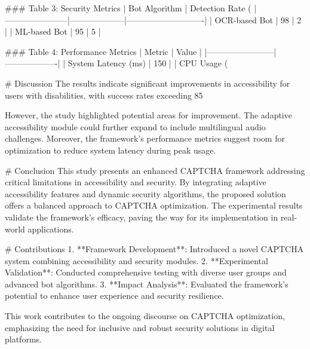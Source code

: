 ### Table 3: Security Metrics  
| Bot Algorithm         | Detection Rate (%
|-----------------------|--------------------|----------------------------|  
| OCR-based Bot         | 98                 | 2                          |  
| ML-based Bot          | 95                 | 5                          |  

### Table 4: Performance Metrics  
| Metric                 | Value             |  
|------------------------|-------------------|  
| System Latency (ms)    | 150               |  
| CPU Usage (%

# Discussion  
The results indicate significant improvements in accessibility for users with disabilities, with success rates exceeding 85%

However, the study highlighted potential areas for improvement. The adaptive accessibility module could further expand to include multilingual audio challenges. Moreover, the framework's performance metrics suggest room for optimization to reduce system latency during peak usage.  

# Conclusion  
This study presents an enhanced CAPTCHA framework addressing critical limitations in accessibility and security. By integrating adaptive accessibility features and dynamic security algorithms, the proposed solution offers a balanced approach to CAPTCHA optimization. The experimental results validate the framework's efficacy, paving the way for its implementation in real-world applications.  

# Contributions  
1. **Framework Development**: Introduced a novel CAPTCHA system combining accessibility and security modules.  
2. **Experimental Validation**: Conducted comprehensive testing with diverse user groups and advanced bot algorithms.  
3. **Impact Analysis**: Evaluated the framework's potential to enhance user experience and security resilience.  

This work contributes to the ongoing discourse on CAPTCHA optimization, emphasizing the need for inclusive and robust security solutions in digital platforms.